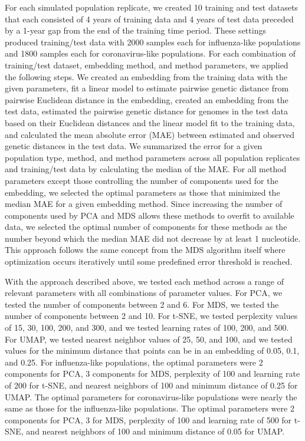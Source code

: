 \documentclass[10pt,letterpaper]{article}
\begin{document}
For each simulated population replicate, we created 10 training and test datasets that each consisted of 4 years of training data and 4 years of test data preceded by a 1-year gap from the end of the training time period.
These settings produced training/test data with 2000 samples each for influenza-like populations and 1800 samples each for coronavirus-like populations.
For each combination of training/test dataset, embedding method, and method parameters, we applied the following steps.
We created an embedding from the training data with the given parameters, fit a linear model to estimate pairwise genetic distance from pairwise Euclidean distance in the embedding, created an embedding from the test data, estimated the pairwise genetic distance for genomes in the test data based on their Euclidean distances and the linear model fit to the training data, and calculated the mean absolute error (MAE) between estimated and observed genetic distances in the test data.
We summarized the error for a given population type, method, and method parameters across all population replicates and training/test data by calculating the median of the MAE.
For all method parameters except those controlling the number of components used for the embedding, we selected the optimal parameters as those that minimized the median MAE for a given embedding method.
Since increasing the number of components used by PCA and MDS allows these methods to overfit to available data, we selected the optimal number of components for these methods as the number beyond which the median MAE did not decrease by at least 1 nucleotide.
This approach follows the same concept from the MDS algorithm itself where optimization occurs iteratively until some predefined error threshold is reached.

With the approach described above, we tested each method across a range of relevant parameters with all combinations of parameter values.
For PCA, we tested the number of components between 2 and 6.
For MDS, we tested the number of components between 2 and 10.
For t-SNE, we tested perplexity values of 15, 30, 100, 200, and 300, and we tested learning rates of 100, 200, and 500.
For UMAP, we tested nearest neighbor values of 25, 50, and 100, and we tested values for the minimum distance that points can be in an embedding of 0.05, 0.1, and 0.25.
For influenza-like populations, the optimal parameters were 2 components for PCA, 3 components for MDS, perplexity of 100 and learning rate of 200 for t-SNE, and nearest neighbors of 100 and minimum distance of 0.25 for UMAP.
The optimal parameters for coronavirus-like populations were nearly the same as those for the influenza-like populations.
The optimal parameters were 2 components for PCA, 3 for MDS, perplexity of 100 and learning rate of 500 for t-SNE, and nearest neighbors of 100 and minimum distance of 0.05 for UMAP.
\end{document}
